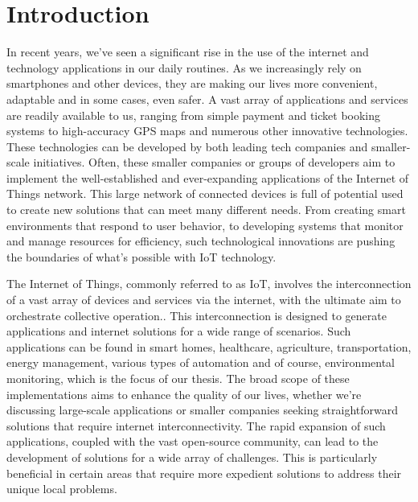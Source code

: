 \chapter{Introduction}
\label{chap1}

In recent years, we've seen a significant rise in the use of the internet and technology applications in our daily routines. As we increasingly rely on smartphones and other devices, they are making our lives more convenient, adaptable and in some cases, even safer. A vast array of applications and services are readily available to us, ranging from simple payment and ticket booking systems to high-accuracy GPS maps and numerous other innovative technologies\cite{madakam2015internet}. These technologies can be developed by both leading tech companies and smaller-scale initiatives. Often, these smaller companies or groups of developers aim to implement the well-established and ever-expanding applications of the Internet of Things network. This large network of connected devices is full of potential used to create new solutions that can meet many different needs. From creating smart environments that respond to user behavior\cite{AdvancesinCrowdAnalysis,OverviewofUrbanMobility}, to developing systems that monitor and manage resources for efficiency, such technological innovations are pushing the boundaries of what's possible with IoT technology.

The Internet of Things, commonly referred to as IoT, involves the interconnection of a vast array of devices and services via the internet, with the ultimate aim to orchestrate collective operation.\cite{madakam2015internet,rose2015internet}. This interconnection is designed to generate applications and internet solutions for a wide range of scenarios. Such applications can be found in smart homes, healthcare, agriculture, transportation, energy management, various types of automation and of course, environmental monitoring,\cite{Systematicreview,BIBRI2018230,7562698} which is the focus of our thesis. The broad scope of these implementations aims to enhance the quality of our lives, whether we're discussing large-scale applications or smaller companies seeking straightforward solutions that require internet interconnectivity. The rapid expansion of such applications, coupled with the vast open-source community, can lead to the development of solutions for a wide array of challenges. This is particularly beneficial in certain areas that require more expedient solutions to address their unique local problems. 

